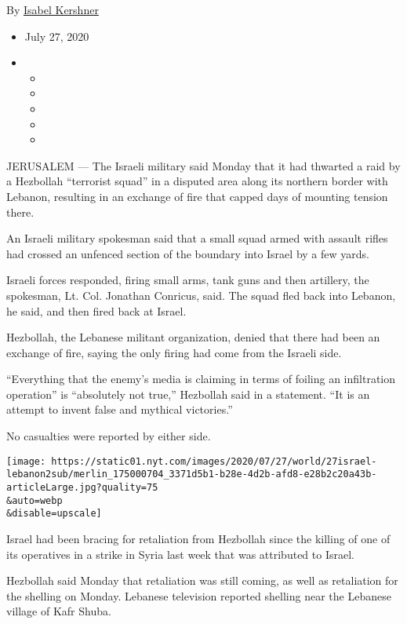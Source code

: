 By \href{https://www.nytimes.com/by/isabel-kershner}{Isabel Kershner}

\begin{itemize}
\item
  July 27, 2020
\item
  \begin{itemize}
  \item
  \item
  \item
  \item
  \item
  \end{itemize}
\end{itemize}

JERUSALEM --- The Israeli military said Monday that it had thwarted a
raid by a Hezbollah ``terrorist squad'' in a disputed area along its
northern border with Lebanon, resulting in an exchange of fire that
capped days of mounting tension there.

An Israeli military spokesman said that a small squad armed with assault
rifles had crossed an unfenced section of the boundary into Israel by a
few yards.

Israeli forces responded, firing small arms, tank guns and then
artillery, the spokesman, Lt. Col. Jonathan Conricus, said. The squad
fled back into Lebanon, he said, and then fired back at Israel.

Hezbollah, the Lebanese militant organization, denied that there had
been an exchange of fire, saying the only firing had come from the
Israeli side.

``Everything that the enemy's media is claiming in terms of foiling an
infiltration operation'' is ``absolutely not true,'' Hezbollah said in a
statement. ``It is an attempt to invent false and mythical victories.''

No casualties were reported by either side.

\texttt{[image: https://static01.nyt.com/images/2020/07/27/world/27israel-lebanon2sub/merlin\_175000704\_3371d5b1-b28e-4d2b-afd8-e28b2c20a43b-articleLarge.jpg?quality=75\\\&auto=webp\\\&disable=upscale]}

Israel had been bracing for retaliation from Hezbollah since the killing
of one of its operatives in a strike in Syria last week that was
attributed to Israel.

Hezbollah said Monday that retaliation was still coming, as well as
retaliation for the shelling on Monday. Lebanese television reported
shelling near the Lebanese village of Kafr Shuba.

